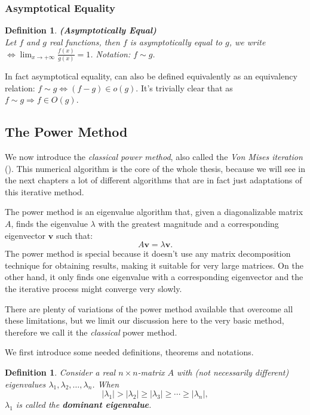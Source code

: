 \documentclass[a4paper,11pt]{report}
\newtheorem{definition}[theorem]{Definition}
\begin{document}
\subsubsection{Asymptotical Equality}
\begin{definition}\textbf{(Asymptotically Equal)}\\
Let $f$ and $g$ real functions, then $f$ is asymptotically equal to $g$, we write $\Leftrightarrow \displaystyle\lim_{x\rightarrow +\infty} \frac{f(x)}{g(x)}=1$. Notation: $f \sim g$.
\end{definition}
In fact asymptotical equality, can also be defined equivalently as an equivalency relation: $f\sim g \Leftrightarrow (f-g) \in o(g)$. It's trivially clear that as $f\sim g \Rightarrow f \in O(g)$.

\subsection{The Power Method}\label{powersection}
We now introduce the \textit{classical power method}, also called the \textit{Von Mises iteration} (\cite{golub}). This
numerical algorithm is the core of the whole thesis, because we will see in the next chapters a lot of different
algorithms that are in fact just  adaptations of this iterative method.
 
The power method is an eigenvalue algorithm that, given a diagonalizable matrix $A$, finds the eigenvalue $\lambda$ with the 
greatest magnitude and a corresponding eigenvector $\mathbf{v}$ such that:
$$A\mathbf{v} = \lambda\mathbf{v}.$$
The power method is special because it doesn't use any matrix decomposition 
technique for obtaining results, making it suitable for very large matrices. On
the other hand, it only finds one eigenvalue with a corresponding eigenvector and the 
the iterative process might converge very slowly. 

There are plenty of variations of the 
power method available that overcome all these limitations, but we limit our discussion
here to the very basic method, therefore we call it the \textit{classical} power method.

We first introduce some needed definitions, theorems and notations.
\begin{definition}
  Consider a  real $n\times n$-matrix $A$ with (not necessarily different) 
  eigenvalues $\lambda_1, \lambda_2, \ldots, \lambda_n$. When
  $$|\lambda_1| > |\lambda_2| \geq |\lambda_3| \geq \cdots \geq |\lambda_n|,$$
  $\lambda_1$ is called the \textbf{dominant eigenvalue}.
\end{definition}
\end{document}
